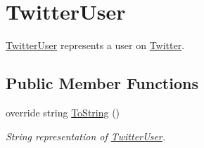 \hypertarget{class_voxel_busters_1_1_native_plugins_1_1_twitter_user}{}\section{Twitter\+User}
\label{class_voxel_busters_1_1_native_plugins_1_1_twitter_user}


\hyperlink{class_voxel_busters_1_1_native_plugins_1_1_twitter_user}{Twitter\+User} represents a user on \hyperlink{class_voxel_busters_1_1_native_plugins_1_1_twitter}{Twitter}.  


\subsection*{Public Member Functions}
\begin{DoxyCompactItemize}
\item 
override string \hyperlink{class_voxel_busters_1_1_native_plugins_1_1_twitter_user_aa73e7c4dd1df5fd5fbf81c7764ee1533}{To\+String} ()
\begin{DoxyCompactList}\small\item\em String representation of \hyperlink{class_voxel_busters_1_1_native_plugins_1_1_twitter_user}{Twitter\+User}. \end{DoxyCompactList}\end{DoxyCompactItemize}

